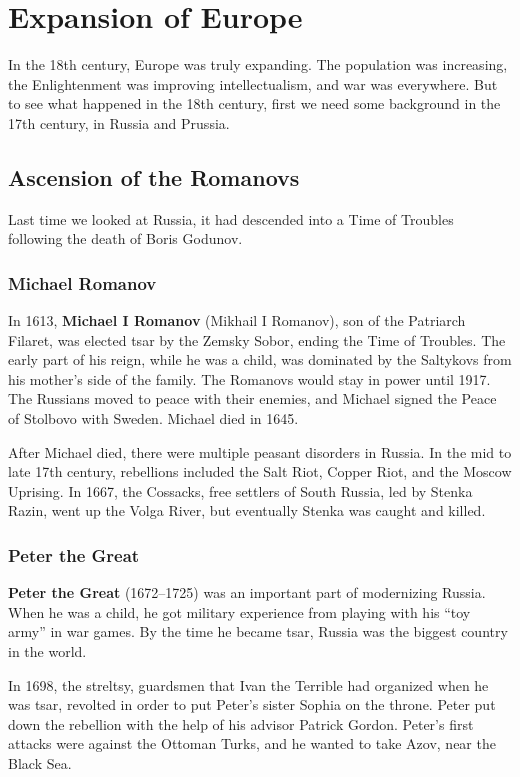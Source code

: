 \chapter{Expansion of Europe}

In the 18th century, Europe was truly expanding.
The population was increasing, the Enlightenment was improving intellectualism, and war was everywhere.
But to see what happened in the 18th century, first we need some background in the 17th century,
in Russia and Prussia.

\section{Ascension of the Romanovs}

Last time we looked at Russia, it had descended into a Time of Troubles following the death of Boris Godunov.

\subsection*{Michael Romanov}

In 1613, \textbf{Michael I Romanov} (Mikhail I Romanov), son of the Patriarch Filaret,
was elected tsar by the Zemsky Sobor, ending the Time of Troubles.
The early part of his reign, while he was a child,
was dominated by the Saltykovs from his mother's side of the family.
The Romanovs would stay in power until 1917.
The Russians moved to peace with their enemies, and Michael signed the Peace of Stolbovo with Sweden.
Michael died in 1645.

After Michael died, there were multiple peasant disorders in Russia.
In the mid to late 17th century, rebellions included the
Salt Riot, Copper Riot, and the Moscow Uprising.
In 1667, the Cossacks, free settlers of South Russia, led by Stenka Razin,
went up the Volga River, but eventually Stenka was caught and killed.

\subsection*{Peter the Great}

\textbf{Peter the Great} (1672--1725) was an important part of modernizing Russia.
When he was a child, he got military experience from playing with his ``toy army'' in war games.
By the time he became tsar, Russia was the biggest country in the world.

In 1698, the streltsy, guardsmen that Ivan the Terrible had organized when he was tsar,
revolted in order to put Peter's sister Sophia on the throne.
Peter put down the rebellion with the help of his advisor Patrick Gordon.
Peter's first attacks were against the Ottoman Turks, and he wanted to take Azov, near the Black Sea.


